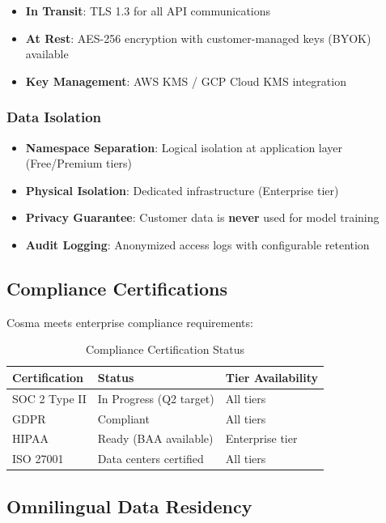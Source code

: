 \begin{itemize}[noitemsep]
    \item \textbf{In Transit}: TLS 1.3 for all API communications
    \item \textbf{At Rest}: AES-256 encryption with customer-managed keys (BYOK) available
    \item \textbf{Key Management}: AWS KMS / GCP Cloud KMS integration
\end{itemize}

\subsubsection{Data Isolation}

\begin{itemize}[noitemsep]
    \item \textbf{Namespace Separation}: Logical isolation at application layer (Free/Premium tiers)
    \item \textbf{Physical Isolation}: Dedicated infrastructure (Enterprise tier)
    \item \textbf{Privacy Guarantee}: Customer data is \textbf{never} used for model training
    \item \textbf{Audit Logging}: Anonymized access logs with configurable retention
\end{itemize}

\subsection{Compliance Certifications}

Cosma meets enterprise compliance requirements:

\begin{table}[ht]
\centering
\small
\begin{tabular}{|l|l|l|}
\hline
\textbf{Certification} & \textbf{Status} & \textbf{Tier Availability} \\
\hline
SOC 2 Type II & In Progress (Q2 target) & All tiers \\
GDPR & Compliant & All tiers \\
HIPAA & Ready (BAA available) & Enterprise tier \\
ISO 27001 & Data centers certified & All tiers \\
\hline
\end{tabular}
\caption{Compliance Certification Status}
\end{table}

\subsection{Omnilingual Data Residency}

